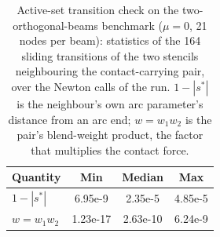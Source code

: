 \begin{table}[ht]
    \centering
    \small
    \caption{Active-set transition check on the two-orthogonal-beams benchmark ($\mu=0$, 21 nodes per beam): statistics of the 164 sliding transitions of the two stencils neighbouring the contact-carrying pair, over the Newton calls of the run. $1-|s^\ast|$ is the neighbour's own arc parameter's distance from an arc end; $w=w_1 w_2$ is the pair's blend-weight product, the factor that multiplies the contact force.}
    \label{tab:pair_event_verification}
    \begin{tabular}{lccc}
        \toprule
        Quantity & Min & Median & Max \\
        \midrule
        $1-|s^\ast|$ & 6.95e-9 & 2.35e-5 & 4.85e-5 \\
        $w = w_1 w_2$ & 1.23e-17 & 2.63e-10 & 6.24e-9 \\
        \bottomrule
    \end{tabular}
\end{table}
